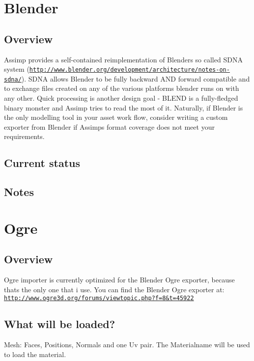 \hypertarget{importer_notes_blender}{}\section{Blender}\label{importer_notes_blender}
\hypertarget{importer_notes_bl_overview}{}\subsection{Overview}\label{importer_notes_bl_overview}
Assimp provides a self-\/contained reimplementation of Blender\textquotesingle{}s so called S\+D\+N\+A system (\href{http://www.blender.org/development/architecture/notes-on-sdna/}{\tt http\+://www.\+blender.\+org/development/architecture/notes-\/on-\/sdna/}). S\+D\+N\+A allows Blender to be fully backward A\+N\+D forward compatible and to exchange files created on any of the various platforms blender runs on with any other. Quick processing is another design goal -\/ B\+L\+E\+N\+D is a fully-\/fledged binary monster and Assimp tries to read the most of it. Naturally, if Blender is the only modelling tool in your asset work flow, consider writing a custom exporter from Blender if Assimp\textquotesingle{}s format coverage does not meet your requirements.\hypertarget{importer_notes_bl_status}{}\subsection{Current status}\label{importer_notes_bl_status}
\hypertarget{importer_notes_bl_notes}{}\subsection{Notes}\label{importer_notes_bl_notes}
\hypertarget{importer_notes_ogre}{}\section{Ogre}\label{importer_notes_ogre}
\hypertarget{importer_notes_overview}{}\subsection{Overview}\label{importer_notes_overview}
Ogre importer is currently optimized for the Blender Ogre exporter, because thats the only one that i use. You can find the Blender Ogre exporter at\+: \href{http://www.ogre3d.org/forums/viewtopic.php?f=8&t=45922}{\tt http\+://www.\+ogre3d.\+org/forums/viewtopic.\+php?f=8\&t=45922}\hypertarget{importer_notes_what}{}\subsection{What will be loaded?}\label{importer_notes_what}
Mesh\+: Faces, Positions, Normals and one Uv pair. The Materialname will be used to load the material.

